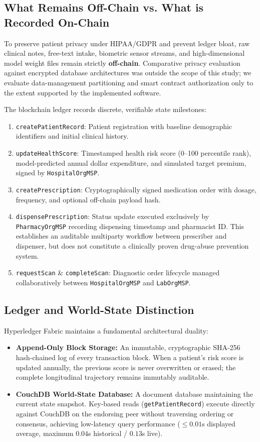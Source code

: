 \documentclass[runningheads]{llncs}
\begin{document}
\subsection{What Remains Off-Chain vs. What is Recorded On-Chain}
To preserve patient privacy under HIPAA/GDPR and prevent ledger bloat, raw clinical notes, free-text intake, biometric sensor streams, and high-dimensional model weight files remain strictly \textbf{off-chain}. Comparative privacy evaluation against encrypted database architectures was outside the scope of this study; we evaluate data-management partitioning and smart contract authorization only to the extent supported by the implemented software.

The blockchain ledger records discrete, verifiable state milestones:
\begin{enumerate}
    \item \texttt{createPatientRecord}: Patient registration with baseline demographic identifiers and initial clinical history.
    \item \texttt{updateHealthScore}: Timestamped health risk score (0--100 percentile rank), model-predicted annual dollar expenditure, and simulated target premium, signed by \texttt{HospitalOrgMSP}.
    \item \texttt{createPrescription}: Cryptographically signed medication order with dosage, frequency, and optional off-chain payload hash.
    \item \texttt{dispensePrescription}: Status update executed exclusively by \texttt{PharmacyOrgMSP} recording dispensing timestamp and pharmacist ID. This establishes an auditable multiparty workflow between prescriber and dispenser, but does not constitute a clinically proven drug-abuse prevention system.
    \item \texttt{requestScan} \& \texttt{completeScan}: Diagnostic order lifecycle managed collaboratively between \texttt{HospitalOrgMSP} and \texttt{LabOrgMSP}.
\end{enumerate}

\subsection{Ledger and World-State Distinction}
Hyperledger Fabric maintains a fundamental architectural duality:
\begin{itemize}
    \item \textbf{Append-Only Block Storage:} An immutable, cryptographic SHA-256 hash-chained log of every transaction block. When a patient's risk score is updated annually, the previous score is never overwritten or erased; the complete longitudinal trajectory remains immutably auditable.
    \item \textbf{CouchDB World-State Database:} A document database maintaining the current state snapshot. Key-based reads (\texttt{getPatientRecord}) execute directly against CouchDB on the endorsing peer without traversing ordering or consensus, achieving low-latency query performance ($\le 0.01$s displayed average, maximum $0.04$s historical / $0.13$s live).
\end{itemize}
\end{document}
